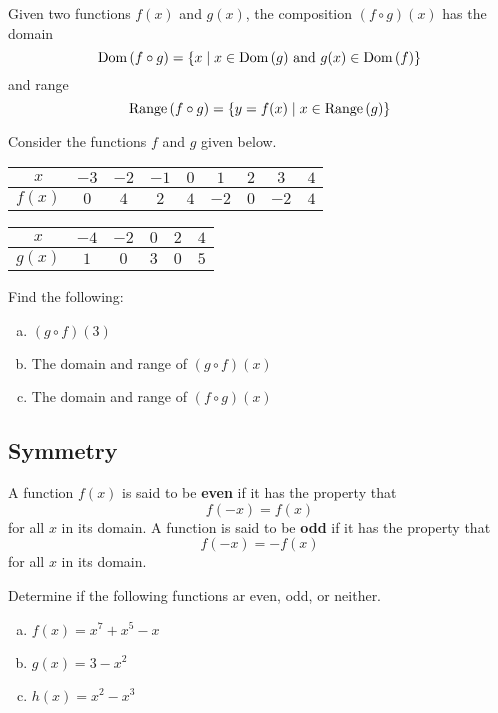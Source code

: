 \documentclass[notes]{subfiles}
\begin{document}
		\begin{rmk}
			Given two functions \(f(x)\) and \(g(x)\), the composition \((f\circ g)(x)\) has the domain
				\[\text{Dom}\,(f\circ g) = \left\lbrace x\mid x\in \text{Dom}\,(g) \text{ and } g(x)\in \text{Dom}\, (f) \right\rbrace\]
			and range
				\[\text{Range}\, (f\circ g) = \left\lbrace y = f(x) \mid x\in \text{Range}\, (g)  \right\rbrace\]
		\end{rmk}
		
		\begin{ex}
			Consider the functions \(f\) and \(g\) given below.
			\begin{center}
				\begin{tabular}{|c|c|c|c|c|c|c|c|c|}\hline
					\(x\) & \(-3\) & \(-2\) & \(-1\) & \(0\) & \(1\) & \(2\) & \(3\) & \(4\) \\ \hline
					\(f(x)\) & \(0\) & \(4\) & \(2\) &\(4\) & \(-2\) & \(0\) & \(-2\) & \(4\) \\ \hline
				\end{tabular}
				\begin{tabular}{|c|c|c|c|c|c|}\hline
					\(x\) & \(-4\) & \(-2\) & \(0\) & \(2\) & \(4\) \\ \hline
					\(g(x)\) & \(1\) & \(0\) & \(3\) & \(0\) & \(5\) \\ \hline
				\end{tabular}
			\end{center}
			Find the following:
			\begin{enumerate}[(a)]
				\item \((g\circ f)(3)\)
					
				\item The domain and range of \((g\circ f)(x)\)
					
				\item The domain and range of \((f\circ g)(x)\)
			\end{enumerate}
		\end{ex}
			\newpage
			
	\subsection*{Symmetry}
		\begin{defn}
			A function \(f(x)\) is said to be \textbf{even} if it has the property that
				\[f(-x) = f(x)\]
			for all \(x\) in its domain. A function is said to be \textbf{odd} if it has the property that
				\[f(-x) = -f(x)\]
			for all \(x\) in its domain.
		\end{defn}
		
		\begin{ex}
			Determine if the following functions ar even, odd, or neither.
			\begin{enumerate}[(a)]
				\item \(f(x) = x^7 + x^5 - x\)
					\vs{1}
					
				\item \(g(x) = 3-x^2\)
					\vs{1}
					
				\item \(h(x) = x^2 - x^3\)
					\vs{1}
			\end{enumerate}
		\end{ex}
			
\clearpage
\end{document}
